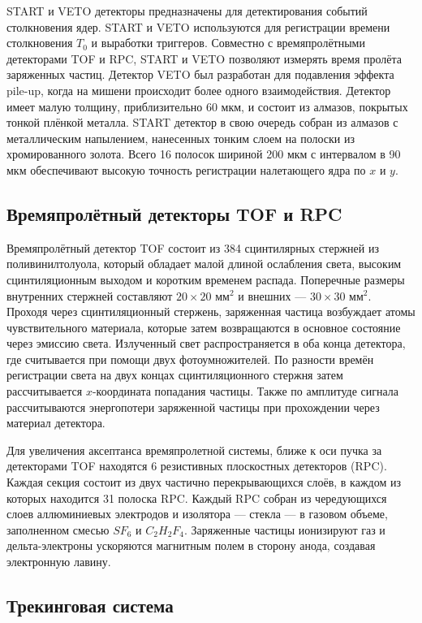 START и VETO детекторы предназначены для детектирования событий столкновения ядер.
START и VETO используются для регистрации времени столкновения $T_0$ и выработки триггеров.
Совместно с времяпролётными детекторами TOF и RPC, START и VETO позволяют измерять время пролёта заряженных частиц.
Детектор VETO был разработан для подавления эффекта pile-up, когда на мишени происходит более одного взаимодействия.
Детектор имеет малую толщину, приблизительно 60 мкм, и состоит из алмазов, покрытых тонкой плёнкой металла. 
START детектор в свою очередь собран из алмазов с металлическим напылением, нанесенных тонким слоем на полоски из хромированного золота.
Всего 16 полосок шириной 200 мкм с интервалом в 90 мкм обеспечивают высокую точность регистрации налетающего ядра по $x$ и $y$.

\subsection{Времяпролётный детекторы TOF и RPC}

Времяпролётный детектор TOF состоит из 384 сцинтилярных стержней из поливинилтолуола, который обладает малой длиной ослабления света, высоким сцинтиляционным выходом и коротким временем распада.
Поперечные размеры внутренних стержней составляют $20 \times 20$ мм$^2$ и внешних --- $30\times30$ мм$^2$.
Проходя через сцинтиляционный стержень, заряженная частица возбуждает атомы чувствительного материала, которые затем возвращаются в основное состояние через эмиссию света.
Излученный свет распространяется в оба конца детектора, где считывается при помощи двух фотоумножителей.
По разности времён регистрации света на двух концах сцинтиляционного стержня затем рассчитывается $x$-координата попадания частицы.
Также по амплитуде сигнала рассчитываются энергопотери заряженной частицы при прохождении через материал детектора.

Для увеличения аксептанса времяпролетной системы, ближе к оси пучка за детекторами TOF находятся 6 резистивных плоскостных детекторов (RPC). 
Каждая секция состоит из двух частично перекрывающихся слоёв, в каждом из которых находится 31 полоска RPC.
Каждый RPC собран из чередующихся слоев аллюминиевых электродов и изолятора --- стекла --- в газовом объеме, заполненном смесью $SF_6$ и $C_2H_2F_4$.
Заряженные частицы ионизируют газ и дельта-электроны ускоряются магнитным полем в сторону анода, создавая электронную лавину.

\subsection{ Трекинговая система }

